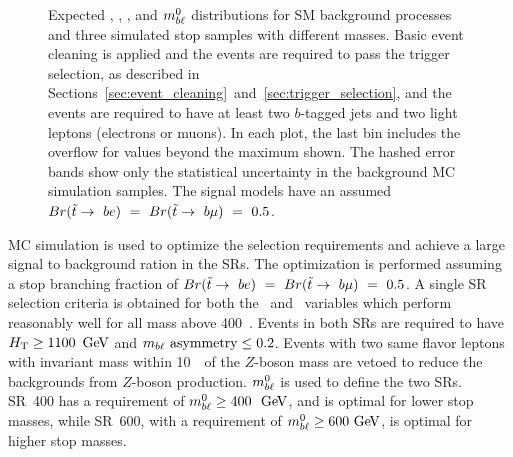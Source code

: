 \begin{figure}
{  }
  \caption{Expected \MLL, \HT, \MBLASYM, and $m_{b\ell}^0$ distributions for SM
    background processes and three simulated stop samples with different masses.
    Basic event cleaning is applied and the events are required to pass the
    trigger selection, as described in
    Sections~\ref{sec:event_cleaning}~and~\ref{sec:trigger_selection}, and the
    events are required to have at least two $b$-tagged jets and two light
    leptons (electrons or muons).
    In each plot, the last bin includes the overflow for values beyond the
    maximum shown. The hashed error bands show only the statistical
    uncertainty in the background MC simulation samples. The signal
    models have an assumed
    $Br(\tilde{t}\rightarrow~be)~=~Br(\tilde{t}\rightarrow~b\mu)~=~0.5$.
  }
  \label{fig:no_data__no_k__inclusive_flavor_all__kinematic_dists}
\end{figure}

MC simulation is used to optimize the selection requirements and achieve a
large signal to background ration in the SRs.
The optimization is performed assuming a stop branching fraction of
$Br(\tilde{t}\rightarrow~be)~=~Br(\tilde{t}\rightarrow~b\mu)~=~0.5$.
A single SR selection criteria is obtained for both the \HT\ and
\MBLASYM\ variables which perform reasonably well for all mass above 400~\GeV.
Events in both SRs are required to have $\HT \geq 1100\,\GeV$ and
$m_{b\ell}~\mathrm{asymmetry} \leq 0.2$.
Events with two same flavor leptons with invariant mass within 10~\GeV\ of the
$Z$-boson mass are vetoed to reduce the backgrounds from $Z$-boson production.
$m_{b\ell}^0$ is used to define the two SRs.
SR~400 has a requirement of $\MBL^0 \geq 400~\GeV$, and is optimal for lower
stop masses, while SR~600, with a requirement of $\MBL^0 \geq 600 \GeV$, is
optimal for higher stop masses.

